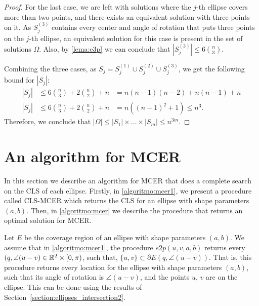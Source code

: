 \begin{proof}
	For the last case, we are left with solutions where the $j$-th ellipse covers more than two points, and there exists an equivalent solution with three points on it. 
	As $S_j^{(3)}$ contains every center and angle of rotation that puts three points on the $j$-th ellipse, an equivalent solution for this case is present in the set of solutions $\Omega$. Also, by \autoref{lema:e3p} we can conclude that $|S_j^{(3)}| \le 6\binom{n}{3}$.
	
	Combining the three cases, as $S_j=S_j^{(1)}\cup S_j^{(2)} \cup S_j^{(3)}$, we get the following bound for $|S_j|$:
	\begin{eqnarray*}
		|S_j| &\le 6\binom{n}{3} + 2\binom{n}{2} + n &= n(n-1)(n-2) + n(n-1) + n\\
		|S_j| &\le 6\binom{n}{3} + 2\binom{n}{2} + n &= n((n-1)^2+1) \le n^3.
	\end{eqnarray*}	
	Therefore, we conclude that  $|\Omega| \le |S_1|\times \dots \times |S_m| \le n^{3m}$.
\end{proof}


\section{An algorithm for MCER}

In this section we describe an algorithm for MCER that does a complete search on the CLS of each ellipse.
Firstly, in \autoref{algoritmo:mcer1}, we present a procedure called CLS-MCER which returns the CLS for an ellipse with shape parameters $(a, b)$. Then, in \autoref{algoritmo:mcer} we describe the procedure that returns an optimal solution for MCER.

Let $E$ be the coverage region of an ellipse with shape parameters $(a, b)$. We assume that in \autoref{algoritmo:mcer1}, the procedure $e2p(u, v, a, b)$ returns every $(q, \angle(u-v) \in \mathbb{R}^2\times[0, \pi)$, such that, $\{u, v\}\subset \partial E(q, \angle(u-v))$. That is, this procedure returns every location for the ellipse with shape parameters $(a, b)$, such that its angle of rotation is $\angle(u-v)$, and the points $u$, $v$ are on the ellipse. This can be done using the results of Section~\ref{section:ellipses_intersection2}.

